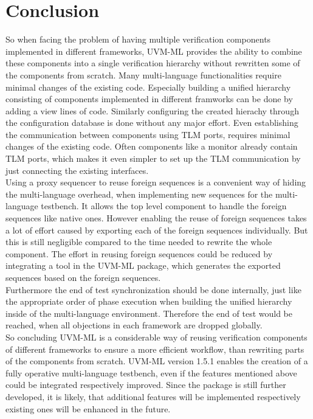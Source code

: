 \section{Conclusion}\label{conclusion}
So when facing the problem of having multiple verification components implemented in different frameworks, UVM-ML provides the ability to combine these components into a single verification hierarchy without rewritten some of the components from scratch. Many multi-language functionalities require minimal changes of the existing code. Especially building a unified hierarchy consisting of components implemented in different framworks can be done by adding a view lines of code. Similarly configuring the created hierachy through the configuration database is done without any major effort. Even establishing the communication between components using TLM ports, requires minimal changes of the existing code. Often components like a monitor already contain TLM ports, which makes it even simpler to set up the TLM communication by just connecting the existing interfaces.\\
Using a proxy sequencer to reuse foreign sequences is a convenient way of hiding the multi-language overhead, when implementing new sequences for the multi-language testbench. It allows the top level component to handle the foreign sequences like native ones. However enabling the reuse of foreign sequences takes a lot of effort caused by exporting each of the foreign sequences individually. But this is still negligible compared to the time needed to rewrite the whole component. The effort in reusing foreign sequences could be reduced by integrating a tool in the UVM-ML package, which generates the exported sequences based on the foreign sequences.\\
Furthermore the end of test synchronization should be done internally, just like the appropriate order of phase execution when building the unified hierarchy inside of the multi-language environment. Therefore the end of test would be reached, when all objections in each framework are dropped globally.\\
So concluding UVM-ML is a considerable way of reusing verification components of different frameworks to ensure a more efficient workflow, than rewriting parts of the components from scratch. UVM-ML version 1.5.1 enables the creation of a fully operative multi-language testbench, even if the features mentioned above could be integrated respectively improved.
Since the package is still further developed, it is likely, that additional features will be implemented respectively existing ones will be enhanced in the future.